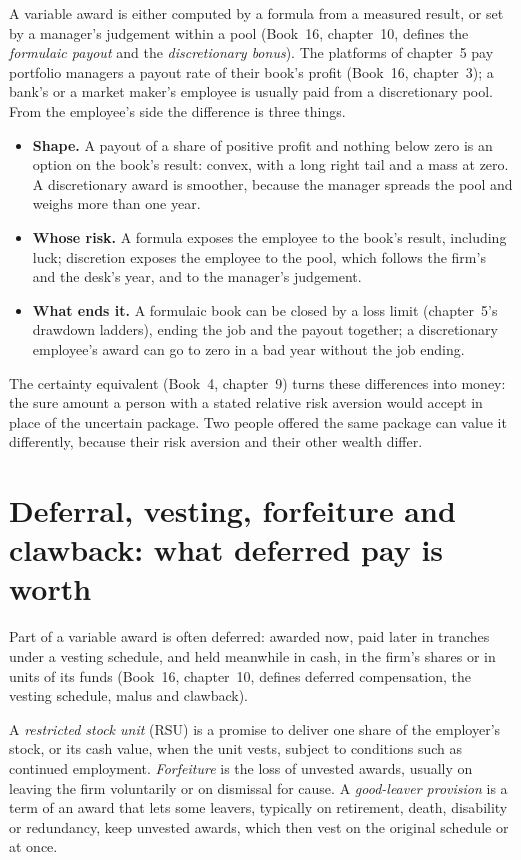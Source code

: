 A variable award is either computed by a formula from a measured result, or set by a manager's judgement within a pool
(Book~16, chapter~10, defines the \emph{formulaic payout} and the \emph{discretionary bonus}). The platforms of
chapter~5 pay portfolio managers a payout rate of their book's profit (Book~16, chapter~3); a bank's or a market
maker's employee is usually paid from a discretionary pool. From the employee's side the difference is three things.
\begin{itemize}
\item \textbf{Shape.} A payout of a share of positive profit and nothing below zero is an option on the book's result:
convex, with a long right tail and a mass at zero. A discretionary award is smoother, because the manager spreads the
pool and weighs more than one year.
\item \textbf{Whose risk.} A formula exposes the employee to the book's result, including luck; discretion exposes the
employee to the pool, which follows the firm's and the desk's year, and to the manager's judgement.
\item \textbf{What ends it.} A formulaic book can be closed by a loss limit (chapter~5's drawdown ladders), ending the
job and the payout together; a discretionary employee's award can go to zero in a bad year without the job ending.
\end{itemize}
The certainty equivalent (Book~4, chapter~9) turns these differences into money: the sure amount a person with a
stated relative risk aversion would accept in place of the uncertain package. Two people offered the same package can
value it differently, because their risk aversion and their other wealth differ.

\section{Deferral, vesting, forfeiture and clawback: what deferred pay is worth}

Part of a variable award is often deferred: awarded now, paid later in tranches under a vesting schedule, and held
meanwhile in cash, in the firm's shares or in units of its funds (Book~16, chapter~10, defines deferred compensation,
the vesting schedule, malus and clawback).

\begin{definition}\label{def:in:how-pay-works:rsu}
A \emph{restricted stock unit} (RSU) is a promise to deliver one share of the employer's
stock, or its cash value, when the unit vests, subject to conditions such as continued employment. \emph{Forfeiture}
 is the loss of unvested awards, usually on leaving the firm voluntarily or on dismissal for cause.
A \emph{good-leaver provision} is a term of an award that lets some leavers, typically on
retirement, death, disability or redundancy, keep unvested awards, which then vest on the original schedule or at once.
\end{definition}


